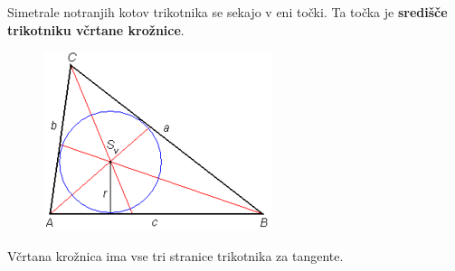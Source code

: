         \begin{frame}

            \begin{alertblock}{}
                Simetrale notranjih kotov trikotnika se sekajo v eni točki. Ta točka je \textbf{središče trikotniku včrtane krožnice}.
            \end{alertblock}

            \begin{figure}
                \includegraphics[scale=0.65]{Slike in skice/Trikotniku_vcrtana_kroznica.png}
            \end{figure}
            
            Včrtana krožnica ima vse tri stranice trikotnika za tangente.

        \end{frame}


